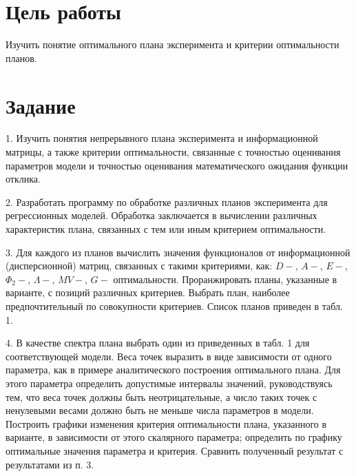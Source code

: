 ﻿%


\section{Цель работы}
Изучить понятие оптимального плана эксперимента и критерии оптимальности планов.


\section{Задание}

1.	Изучить понятия непрерывного плана эксперимента и информационной матрицы, а также критерии оптимальности, связанные с точностью оценивания параметров модели и точностью оценивания математического ожидания функции отклика.

2.	Разработать программу по обработке различных планов эксперимента для регрессионных моделей. Обработка заключается в вычислении различных характеристик плана, связанных с тем или иным критерием оптимальности.

3.	Для каждого из планов вычислить значения функционалов от информационной (дисперсионной) матриц, связанных с такими критериями, как: $D-$, $A-$, $E-$, $\Phi_2-$, $\Lambda-$,  $MV-$, $G-$ оптимальности. Проранжировать планы, указанные в варианте, с позиций различных критериев. Выбрать план, наиболее предпочтительный по совокупности критериев. Список планов приведен в табл. 1.

4.	В качестве спектра плана выбрать один из приведенных в табл. 1 для соответствующей модели. Веса точек выразить в виде зависимости от одного параметра, как в примере аналитического построения оптимального плана. Для этого параметра определить допустимые интервалы значений, руководствуясь тем, что веса точек должны быть неотрицательные, а число таких точек с ненулевыми весами должно быть не меньше числа параметров в модели. Построить графики изменения критерия оптимальности плана, указанного в варианте, в зависимости от этого скалярного параметра; определить по графику оптимальные значения параметра и критерия. Сравнить полученный результат с результатами из п. 3.

